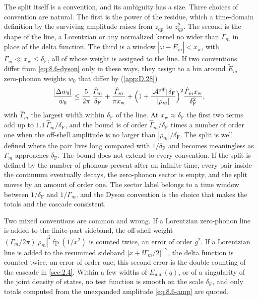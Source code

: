 The split itself is a convention, and its ambiguity has a size. Three choices of convention are natural. The first is the power of the residue, which a time-domain definition by the surviving amplitude raises from $z_{\mathrm{qp}}$ to $z_{\mathrm{qp}}^2$. The second is the shape of the line, a Lorentzian or any normalized kernel no wider than $\varGamma_m$ in place of the delta function. The third is a window $|\omega - \tilde E_m| < x_{\mathrm{w}}$, with $\varGamma_m \ll x_{\mathrm{w}} \le \delta_{\mathrm{F}}$, all of whose weight is assigned to the line. If two conventions differ from \cref{eq:8.6-dyson} only in these ways, they assign to a bin around $\tilde E_m$ zero-phonon weights $w_0$ that differ by (\cref{app:D.28})
\begin{equation}
  \frac{|\Delta w_0|}{w_0} \le \frac{5}{2\pi}\,\frac{\hat\varGamma_m}{\delta_{\mathrm{F}}} + \frac{\hat\varGamma_m}{\pi x_{\mathrm{w}}} + \Bigl(1 + \frac{|\mathcal{A}^{\mathrm{off}}|\,\delta_{\mathrm{F}}}{|\rho_m|}\Bigr)^2\frac{\hat\varGamma_mx_{\mathrm{w}}}{\delta_{\mathrm{F}}^2} ,
  \label{eq:8.6-ambiguity}
\end{equation}
with $\hat\varGamma_m$ the largest width within $\delta_{\mathrm{F}}$ of the line. At $x_{\mathrm{w}} \approx \delta_{\mathrm{F}}$ the first two terms add up to $1.1\,\hat\varGamma_m/\delta_{\mathrm{F}}$, and the bound is of order $\hat\varGamma_m/\delta_{\mathrm{F}}$ times a number of order one when the off-shell amplitude is no larger than $|\rho_m|/\delta_{\mathrm{F}}$. The split is well defined where the pair lives long compared with $1/\delta_{\mathrm{F}}$ and becomes meaningless as $\varGamma_m$ approaches $\delta_{\mathrm{F}}$. The bound does not extend to every convention. If the split is defined by the number of phonons present after an infinite time, every pair inside the continuum eventually decays, the zero-phonon sector is empty, and the split moves by an amount of order one. The sector label belongs to a time window between $1/\delta_{\mathrm{F}}$ and $1/\varGamma_m$, and the Dyson convention is the choice that makes the totals and the cascade consistent. 

Two mixed conventions are common and wrong. If a Lorentzian zero-phonon line is added to the finite-part sideband, the off-shell weight $(\varGamma_m/2\pi)|\rho_m|^2\operatorname{fp}(1/x^2)$ is counted twice, an error of order $g^2$. If a Lorentzian line is added to the resummed sideband $|x + \ii\varGamma_m/2|^{-2}$, the delta function is counted twice, an error of order one; this second error is the double counting of the cascade in \cref{sec:2.4}. Within a few widths of $E_{\mathrm{min}}(q)$, or of a singularity of the joint density of states, no test function is smooth on the scale $\delta_{\mathrm{F}}$, and only totals computed from the unexpanded amplitude \cref{eq:8.6-amp} are quoted.

